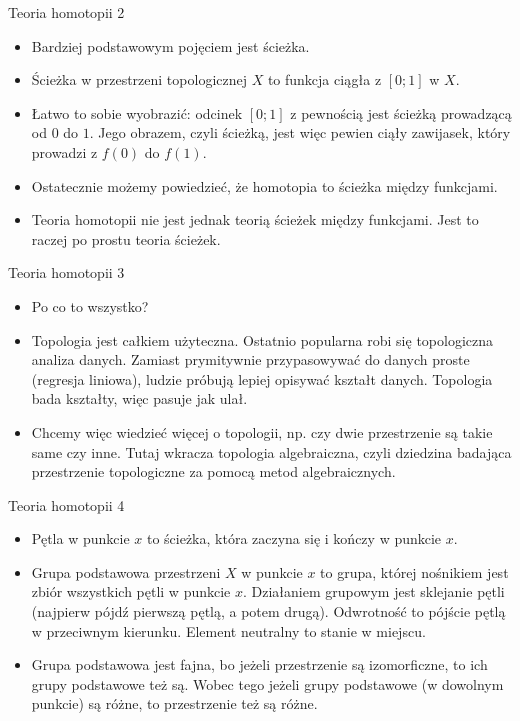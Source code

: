 \documentclass{beamer}
\begin{document}
\begin{frame}{Teoria homotopii 2}
\begin{itemize}
	\item Bardziej podstawowym pojęciem jest ścieżka.
	\item Ścieżka w przestrzeni topologicznej $X$ to funkcja ciągła z $[0; 1]$ w $X$.
	\item Łatwo to sobie wyobrazić: odcinek $[0; 1]$ z pewnością jest ścieżką prowadzącą od $0$ do $1$. Jego obrazem, czyli ścieżką, jest więc pewien ciąły zawijasek, który prowadzi z $f(0)$ do $f(1)$.
	\item Ostatecznie możemy powiedzieć, że homotopia to ścieżka między funkcjami.
	\item Teoria homotopii nie jest jednak teorią ścieżek między funkcjami. Jest to raczej po prostu teoria ścieżek.
\end{itemize}
\end{frame}

\begin{frame}{Teoria homotopii 3}
\begin{itemize}
	\item Po co to wszystko?
	\item Topologia jest całkiem użyteczna. Ostatnio popularna robi się topologiczna analiza danych. Zamiast prymitywnie przypasowywać do danych proste (regresja liniowa), ludzie próbują lepiej opisywać kształt danych. Topologia bada kształty, więc pasuje jak ulał.
	\item Chcemy więc wiedzieć więcej o topologii, np. czy dwie przestrzenie są takie same czy inne. Tutaj wkracza topologia algebraiczna, czyli dziedzina badająca przestrzenie topologiczne za pomocą metod algebraicznych.
\end{itemize}
\end{frame}

\begin{frame}{Teoria homotopii 4}
\begin{itemize}
	\item Pętla w punkcie $x$ to ścieżka, która zaczyna się i kończy w punkcie $x$.
	\item Grupa podstawowa przestrzeni $X$ w punkcie $x$ to grupa, której nośnikiem jest zbiór wszystkich pętli w punkcie $x$. Działaniem grupowym jest sklejanie pętli (najpierw pójdź pierwszą pętlą, a potem drugą). Odwrotność to pójście pętlą w przeciwnym kierunku. Element neutralny to stanie w miejscu.
	\item Grupa podstawowa jest fajna, bo jeżeli przestrzenie są izomorficzne, to ich grupy podstawowe też są. Wobec tego jeżeli grupy podstawowe (w dowolnym punkcie) są różne, to przestrzenie też są różne.
\end{itemize}
\end{frame}
\end{document}
